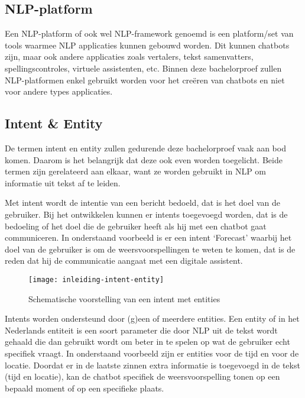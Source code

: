 \subsection{NLP-platform}
\label{subsec:begrippen-nlp-platform}

Een NLP-platform of ook wel NLP-framework genoemd is een platform/set van tools waarmee NLP applicaties kunnen gebouwd worden. Dit kunnen chatbots zijn, maar ook andere applicaties zoals vertalers, tekst samenvatters, spellingscontroles, virtuele assistenten, etc. Binnen deze bachelorproef zullen NLP-platformen enkel gebruikt worden voor het creëren van chatbots en niet voor andere types applicaties.

\subsection{Intent \& Entity}
\label{subsec:begrippen-intent-entity}

De termen intent en entity zullen gedurende deze bachelorproef vaak aan bod komen. Daarom is het belangrijk dat deze ook even worden toegelicht. Beide termen zijn gerelateerd aan elkaar, want ze worden gebruikt in NLP om informatie uit tekst af te leiden.

Met intent wordt de intentie van een bericht bedoeld, dat is het doel van de gebruiker. Bij het ontwikkelen kunnen er intents toegevoegd worden, dat is de bedoeling of het doel die de gebruiker heeft als hij met een chatbot gaat communiceren. In onderstaand voorbeeld is er een intent ‘Forecast’ waarbij het doel van de gebruiker is om de weersvoorspellingen te weten te komen, dat is de reden dat hij de communicatie aangaat met een digitale assistent.

\begin{figure}[!htbp]
    \label{fig:inleiding-intent-entity}
    \centering
    \texttt{[image: inleiding-intent-entity]}
    \caption{Schematische voorstelling van een intent met entities \autocite{GoogleCloud2020}}
\end{figure}

Intents worden ondersteund door (g)een of meerdere entities. Een entity of in het Nederlands entiteit is een soort parameter die door NLP uit de tekst wordt gehaald die dan gebruikt wordt om beter in te spelen op wat de gebruiker echt specifiek vraagt. In onderstaand voorbeeld zijn er entities voor de tijd en voor de locatie. Doordat er in de laatste zinnen extra informatie is toegevoegd in de tekst (tijd en locatie), kan de chatbot specifiek de weersvoorspelling tonen op een bepaald moment of op een specifieke plaats.

